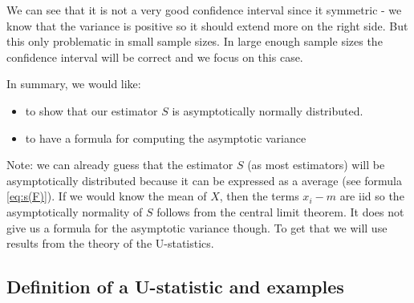 \documentclass[12pt]{article}
\begin{document}
We can see that it is not a very good confidence interval since it
symmetric - we know that the variance is positive so it should extend
more on the right side. But this only problematic in small sample
sizes. In large enough sample sizes the confidence interval will be
correct and we focus on this case.

\clearpage

In summary, we would like:
\begin{itemize}
\item to show that our estimator \(S\) is asymptotically normally distributed.
\item to have a formula for computing the asymptotic variance
\end{itemize}

\bigskip

Note: we can already guess that the estimator \(S\) (as most
estimators) will be asymptotically distributed because it can be
expressed as a average (see formula \eqref{eq:s(F)}). If we would know
the mean of \(X\), then the terms \(x_i-m\) are iid so the
asymptotically normality of \(S\) follows from the central limit
theorem. It does not give us a formula for the asymptotic variance
though. To get that we will use results from the theory of the U-statistics.

\subsection{Definition of a U-statistic and examples}
\label{sec:org0e0f822}
\end{document}

